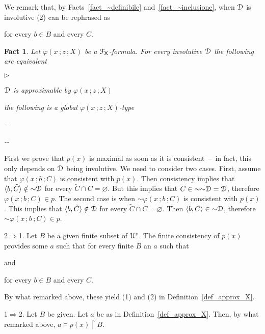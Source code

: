 \documentclass{amsproc}
\makeatletter
\newcommand{\mylabel}[1]{{#1}\hfill}
\renewenvironment{itemize}
  {\begin{list}{$\triangleright$}{%
  \setlength{\parskip}{0mm}
  \setlength{\topsep}{.1\baselineskip}
  \setlength{\rightmargin}{0mm}
  \setlength{\listparindent}{0mm}
  \setlength{\itemindent}{0mm}
  \setlength{\labelwidth}{3ex}
  \setlength{\itemsep}{.1\baselineskip}
  \setlength{\parsep}{.1\baselineskip}
  \setlength{\partopsep}{0mm}
  \setlength{\labelsep}{1ex}
  \setlength{\leftmargin}{\labelwidth+\labelsep}
  \let\makelabel\mylabel}}{%
\end{list}}
\newcounter{thm}
\theoremstyle{mio}
\newtheorem{fact}[thm]{Fact}\tcolorboxenvironment{fact}{mythm}
\providecommand{\proofNameStyle}{\bfseries}
\renewenvironment{proof}[1][\proofname]{\par
  \pushQED{\qed}%
  \normalfont%
  \trivlist
  \item[\hskip\labelsep
        \proofNameStyle
    #1\@addpunct{.}]\ignorespaces
}{%
  \popQED\endtrivlist\@endpefalse
}
\makeatother
\begin{document}
We remark that, by Facts~\ref{fact_~definibile} and~\ref{fact_~inclusione}, when ${\EuScript D}$ is involutive 
%
%
(2) can be rephrased as

\hfill for every $b\in B$ and every $C$.

\begin{fact}
  Let $\varphi(x\,;z\,;X)$ be a ${\EuScript F}_{\sf X}$-formula.
  For every involutive ${\EuScript D}$ the following are equivalent
  \begin{itemize}
    \item [1.] ${\EuScript D}$ is approximable by $\varphi(x\,;z\,;X)$
    \item [2.] the following is a global $\varphi(x\,;z\,;X)$-type\smallskip
    
    \noindent\kern-\kern-
    \smallskip

    \noindent\kern-\kern-
  
  \end{itemize}
\end{fact}

\begin{proof}
  First we prove that $p(x)$ is maximal as soon as it is consistent~--~in fact, this only depends on ${\EuScript D}$ being involutive.
  We need to consider two cases.
  First, assume that $\varphi(x\,;b\,;C)$ is consistent with $p(x)$.
  Then consistency implies that $\langle b,\tilde C\rangle\notin{\sim}{\EuScript D}$ for every $\tilde C\cap C=\varnothing$.
  But this implies that $C\in{\sim}{\sim}{\EuScript D}={\EuScript D}$, therefore $\varphi(x\,;b\,;C)\in p$.
  The second case is when ${\sim}\varphi(x\,;b\,;C)$ is consistent with $p(x)$.
  This implies that $\langle b,\tilde C\rangle\notin{\EuScript D}$ for every $\tilde C\cap C=\varnothing$.
  Then $\langle b,C\rangle\in{\sim}{\EuScript D}$,  therefore ${\sim}\varphi(x\,;b\,;C)\in p$.

  2$\Rightarrow$1.
  Let $B$ be a given finite subset of ${\EuScript U}^z$.
  The finite consistency of $p(x)$ provides some $a$ such that for every finite $B$ an $a$ such that

  \quad and 
  
  \hfill for every $b\in B$ and every $C$. 

  By what remarked above, these yield (1) and (2) in Definition~\ref{def_approx_X}.
  
  1$\Rightarrow$2. 
  Let $B$ be given.
  Let $a$ be as in Definition~\ref{def_approx_X}.
  Then, by what remarked above, $a\models p(x)\restriction B$.
\end{proof}
\end{document}
